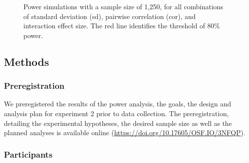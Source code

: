 \documentclass[
]{interact}
\begin{document}
\label{cell-fig-power-1250}
\begin{figure}[H]


\caption{\label{fig-power-1250}Power simulations with a sample size of
1,250, for all combinations of standard deviation (sd), pairwise
correlation (cor), and interaction effect size. The red line identifies
the threshold of 80\% power.}

\end{figure}%

\subsection{Methods}\label{sec-exp2-methods}

\subsubsection{Preregistration}\label{sec-exp2-prereg}

We preregistered the results of the power analysis, the goals, the
design and analysis plan for experiment 2 prior to data collection. The
preregistration, detailing the experimental hypotheses, the desired
sample size as well as the planned analyses is available online
(\url{https://doi.org/10.17605/OSF.IO/3NFQP}).

\subsubsection{Participants}\label{sec-exp2-methods-participants}
\end{document}

